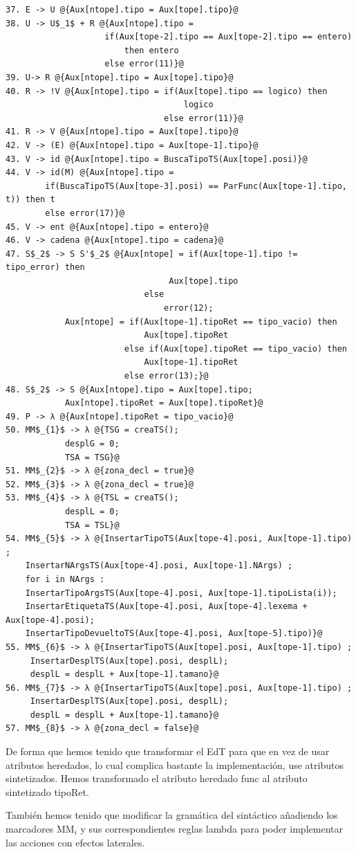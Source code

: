 \documentclass[a4paper, 12pt]{article}
\begin{document}
\begin{lstlisting}[style=EdT]
37. E -> U @{Aux[ntope].tipo = Aux[tope].tipo}@
38. U -> U$_1$ + R @{Aux[ntope].tipo = 
					if(Aux[tope-2].tipo == Aux[tope-2].tipo == entero)
						then entero 
					else error(11)}@
39. U-> R @{Aux[ntope].tipo = Aux[tope].tipo}@
40. R -> !V @{Aux[ntope].tipo = if(Aux[tope].tipo == logico) then 
									logico
             					else error(11)}@
41. R -> V @{Aux[ntope].tipo = Aux[tope].tipo}@
42. V -> (E) @{Aux[ntope].tipo = Aux[tope-1].tipo}@
43. V -> id @{Aux[ntope].tipo = BuscaTipoTS(Aux[tope].posi)}@
44. V -> id(M) @{Aux[ntope].tipo = 
		if(BuscaTipoTS(Aux[tope-3].posi) == ParFunc(Aux[tope-1].tipo, t)) then t
		else error(17)}@
45. V -> ent @{Aux[ntope].tipo = entero}@
46. V -> cadena @{Aux[ntope].tipo = cadena}@
47. S$_2$ -> S S'$_2$ @{Aux[ntope] = if(Aux[tope-1].tipo != tipo_error) then
								 Aux[tope].tipo
							else 
								error(12);
			Aux[ntope] = if(Aux[tope-1].tipoRet == tipo_vacio) then 
							Aux[tope].tipoRet
						else if(Aux[tope].tipoRet == tipo_vacio) then 
							Aux[tope-1].tipoRet 
						else error(13);}@
48. S$_2$ -> S @{Aux[ntope].tipo = Aux[tope].tipo;
			Aux[ntope].tipoRet = Aux[tope].tipoRet}@
49. P -> λ @{Aux[ntope].tipoRet = tipo_vacio}@
50. MM$_{1}$ -> λ @{TSG = creaTS();
			desplG = 0;
			TSA = TSG}@
51. MM$_{2}$ -> λ @{zona_decl = true}@
52. MM$_{3}$ -> λ @{zona_decl = true}@
53. MM$_{4}$ -> λ @{TSL = creaTS();
			desplL = 0;
			TSA = TSL}@
54. MM$_{5}$ -> λ @{InsertarTipoTS(Aux[tope-4].posi, Aux[tope-1].tipo) ;
	InsertarNArgsTS(Aux[tope-4].posi, Aux[tope-1].NArgs) ;
	for i in NArgs :
	InsertarTipoArgsTS(Aux[tope-4].posi, Aux[tope-1].tipoLista(i));
	InsertarEtiquetaTS(Aux[tope-4].posi, Aux[tope-4].lexema + Aux[tope-4].posi); 
	InsertarTipoDevueltoTS(Aux[tope-4].posi, Aux[tope-5].tipo)}@
55. MM$_{6}$ -> λ @{InsertarTipoTS(Aux[tope].posi, Aux[tope-1].tipo) ;
     InsertarDesplTS(Aux[tope].posi, desplL);
     desplL = desplL + Aux[tope-1].tamano}@
56. MM$_{7}$ -> λ @{InsertarTipoTS(Aux[tope].posi, Aux[tope-1].tipo) ;
     InsertarDesplTS(Aux[tope].posi, desplL);
     desplL = desplL + Aux[tope-1].tamano}@
57. MM$_{8}$ -> λ @{zona_decl = false}@
\end{lstlisting}
\newpage
De forma que hemos tenido que transformar el EdT para que en vez de usar atributos heredados, lo cual complica bastante la implementación, use atributos sintetizados. Hemos transformado el atributo heredado func al atributo sintetizado tipoRet.

También hemos tenido que modificar la gramática del sintáctico añadiendo los marcadores MM$_i$ y sus correspondientes reglas lambda para poder implementar las acciones con efectos laterales.
\end{document}
